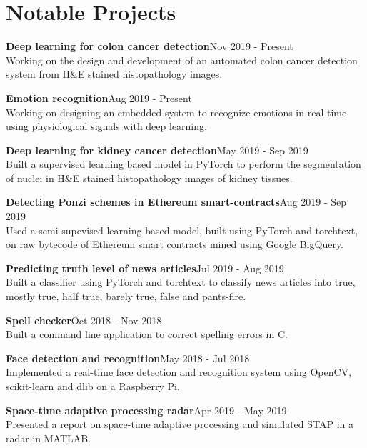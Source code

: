 \documentclass[letterpaper]{article}
\renewenvironment{itemize}{
  \begin{list}{}{
    \setlength{\leftmargin}{1.5em}
  }
}{
  \end{list}
}
\begin{document}
\section*{Notable Projects}
  \begin{itemize}
    \item
    \textbf{Deep learning for colon cancer detection}\hfill{\textcolor{black!80}{\small{Nov 2019 - Present}}}\\
    Working on the design and development of an automated colon cancer detection system from H\&E stained histopathology images.

    \item
    \textbf{Emotion recognition}\hfill{\textcolor{black!80}{\small{Aug 2019 - Present}}}\\
    Working on designing an embedded system to recognize emotions in real-time using physiological signals with deep learning.

    \item
    \textbf{Deep learning for kidney cancer detection}\hfill{\textcolor{black!80}{\small{May 2019 - Sep 2019}}}\\
    Built a supervised learning based model in PyTorch to perform the segmentation of nuclei in H\&E stained histopathology images of kidney tissues.

    \item
    \textbf{Detecting Ponzi schemes in Ethereum smart-contracts}\hfill{\textcolor{black!80}{\small{Aug 2019 - Sep 2019}}}\\
    Used a semi-supevised learning based model, built using PyTorch and torchtext, on raw bytecode of Ethereum smart contracts mined using Google BigQuery.

    \item
    \textbf{Predicting truth level of news articles}\hfill{\textcolor{black!80}{\small{Jul 2019 - Aug 2019}}}\\
    Built a classifier using PyTorch and torchtext to classify news articles into true, mostly true, half true, barely true, false and pants-fire.

    \item
    \textbf{Spell checker}\hfill{\textcolor{black!80}{\small{Oct 2018 - Nov 2018}}}\\
    Built a command line application to correct spelling errors in C.

    \item
    \textbf{Face detection and recognition}\hfill{\textcolor{black!80}{\small{May 2018 - Jul 2018}}}\\
    Implemented a real-time face detection and recognition system using OpenCV, scikit-learn and dlib on a Raspberry Pi.

    \item
    \textbf{Space-time adaptive processing radar}\hfill{\textcolor{black!80}{\small{Apr 2019 - May 2019}}}\\
    Presented a report on space-time adaptive processing and simulated STAP in a radar in MATLAB.

  \end{itemize}
\end{document}

